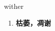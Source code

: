 
\begin{frame}
{\huge wither}
\begin{center}
\begin{enumerate}\Large
  \item \textbf{枯萎，凋谢}
\end{enumerate}
\end{center}
\end{frame}
